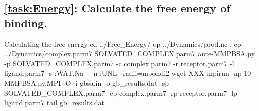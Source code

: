     \subsection{\cref{task:Energy}: Calculate the free energy of binding.}
    \begin{bashcmd}[label=cmd:task7]{Calculating the free energy}
    cd ../Free_Energy/
    cp ../Dynamics/prod.nc .
    cp ../Dynamics/complex.parm7 SOLVATED_COMPLEX.parm7
    ante-MMPBSA.py -p SOLVATED_COMPLEX.parm7 -c complex.parm7 -r receptor.parm7 -l ligand.parm7 -s :WAT,Na+ -n :UNL --radii=mbondi2
    wget XXX
    mpirun -np 10 MMPBSA.py.MPI -O -i gbsa.in -o gb_results.dat -sp SOLVATED_COMPLEX.parm7 -cp complex.parm7 -rp receptor.parm7 -lp ligand.parm7
    tail gb_results.dat
    \end{bashcmd}
